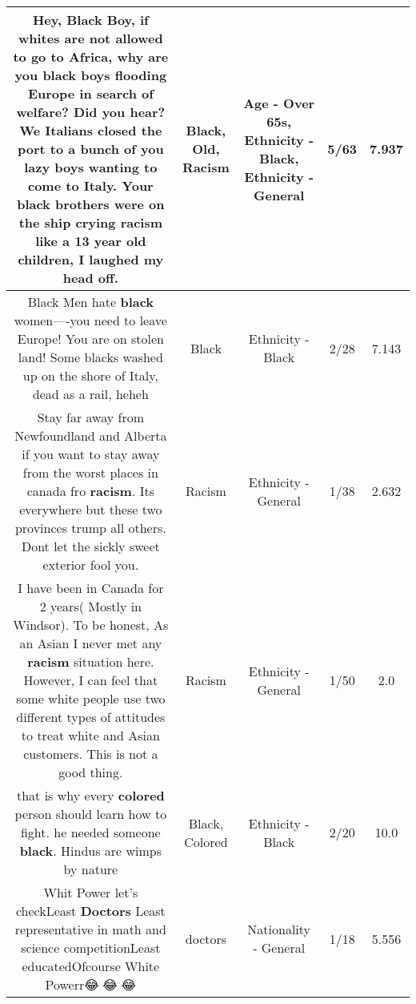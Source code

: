 \documentclass[11pt]{article}
\newlength\mylength
\begin{document}
\begin{center}
\begin{longtable}{|C{.65\mylength}|C{.30\mylength}|C{.12\mylength}|C{.12\mylength}|C{.12\mylength}|}
  \small Hey,  \textbf{Black} Boy,  if whites are not allowed to go to Africa,  why are you \textbf{black} boys flooding Europe in search of welfare?   Did you hear?  We Italians closed the port to a bunch of you lazy boys wanting to come to Italy.  Your \textbf{black} brothers were on the ship crying \textbf{racism} like a 13 year \textbf{old} children,  I laughed my head off.\normalsize   & Black, Old, Racism & Age - Over 65s, Ethnicity - Black, Ethnicity - General & 5/63 & 7.937 \\  \hline
  \small Black Men hate \textbf{black} women----you need to leave Europe!  You are on stolen land!   Some blacks washed up on the shore of Italy,  dead as a rail,  heheh\normalsize   & Black & Ethnicity - Black & 2/28 & 7.143 \\  \hline
  \small Stay far away from Newfoundland and Alberta if you want to stay away from the worst places in canada fro \textbf{racism}. Its everywhere but these two provinces trump all others. Dont let the sickly sweet exterior fool you.\normalsize   & Racism & Ethnicity - General & 1/38 & 2.632 \\  \hline
  \small I have been in Canada for 2 years( Mostly in Windsor). To be honest, As an Asian I never met any \textbf{racism} situation here. However, I can feel that some white people use two different types of attitudes to treat white and Asian customers. This is not a good thing.\normalsize   & Racism & Ethnicity - General & 1/50 & 2.0 \\  \hline
  \small that is why every \textbf{colored} person should learn how to fight. he needed someone \textbf{black}. Hindus are wimps by nature\normalsize   & Black, Colored & Ethnicity - Black & 2/20 & 10.0 \\  \hline
  \small Whit Power let's checkLeast \textbf{Doctors} Least representative in math and science competitionLeast educatedOfcourse White Powerr😂🤣😂🤣😂\normalsize   & doctors & Nationality - General & 1/18 & 5.556 \\  \hline

\end{longtable}
\end{center}
\end{document}
